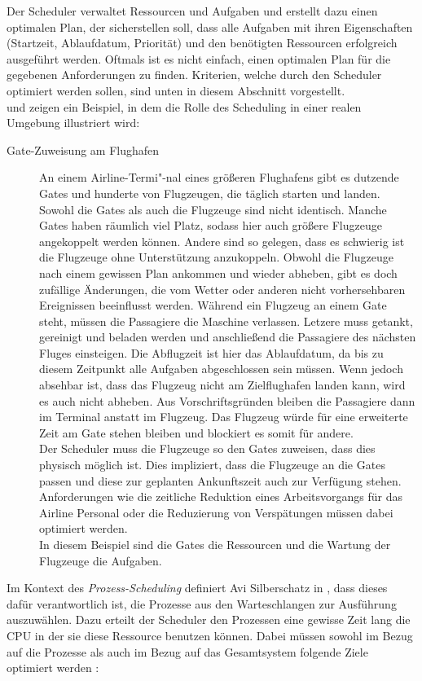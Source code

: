 Der Scheduler verwaltet Ressourcen und Aufgaben und erstellt dazu einen optimalen Plan, der sicherstellen soll, dass alle Aufgaben mit ihren Eigenschaften (Startzeit, Ablaufdatum, Priorität) und den benötigten Ressourcen erfolgreich ausgeführt werden. Oftmals ist es nicht einfach, einen optimalen Plan für die gegebenen Anforderungen zu finden. Kriterien, welche durch den Scheduler optimiert werden sollen, sind unten in diesem Abschnitt vorgestellt.\\
\cite{mpinedo} und \cite{aagnetis} zeigen ein Beispiel, in dem die Rolle des Scheduling in einer realen Umgebung illustriert wird:
\begin{description}
\item[Gate-Zuweisung am Flughafen]
An einem Airline-Termi"-nal eines größeren Flughafens gibt es dutzende Gates und hunderte von Flugzeugen, die täglich starten und landen. Sowohl die Gates als auch die Flugzeuge sind nicht identisch. Manche Gates haben räumlich viel Platz, sodass hier auch größere Flugzeuge angekoppelt werden können. Andere sind so gelegen, dass es schwierig ist die Flugzeuge ohne Unterstützung anzukoppeln. Obwohl die Flugzeuge nach einem gewissen Plan ankommen und wieder abheben, gibt es doch zufällige Änderungen, die vom Wetter oder anderen nicht vorhersehbaren Ereignissen beeinflusst werden. Während ein Flugzeug an einem Gate steht, müssen die Passagiere die Maschine verlassen. Letzere muss getankt, gereinigt und beladen werden und anschließend die Passagiere des nächsten Fluges einsteigen. Die Abflugzeit ist hier das Ablaufdatum, da bis zu diesem Zeitpunkt alle Aufgaben abgeschlossen sein müssen. Wenn jedoch absehbar ist, dass das Flugzeug nicht am Zielflughafen landen kann, wird es auch nicht abheben. Aus Vorschriftsgründen bleiben die Passagiere dann im Terminal anstatt im Flugzeug. Das Flugzeug würde für eine erweiterte Zeit am Gate stehen bleiben und blockiert es somit für andere.\\
Der Scheduler muss die Flugzeuge so den Gates zuweisen, dass dies physisch möglich ist. Dies impliziert, dass die Flugzeuge an die Gates passen und diese zur geplanten Ankunftszeit auch zur Verfügung stehen. Anforderungen wie die zeitliche Reduktion eines Arbeitsvorgangs für das Airline Personal oder die Reduzierung von Verspätungen müssen dabei optimiert werden.\\
In diesem Beispiel sind die Gates die Ressourcen und die Wartung der Flugzeuge die Aufgaben. 
\end{description}
Im Kontext des \textit{Prozess-Scheduling} definiert Avi Silberschatz in \cite{asilberschatz}, dass dieses dafür verantwortlich ist, die Prozesse aus den Warteschlangen zur Ausführung aus\-zu\-wäh\-len. Dazu erteilt der Scheduler den Prozessen eine gewisse Zeit lang die CPU in der sie diese Ressource benutzen können. Dabei müssen sowohl im Bezug auf die Prozesse als auch im Bezug auf das Gesamtsystem folgende Ziele optimiert werden \cite{asilberschatz} \cite{rlove}:\\
